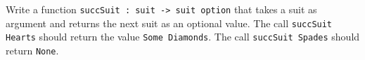 Write a function \lstinline{succSuit : suit -> suit option} that takes
a suit as argument and returns the next suit as an optional value.  The
call \lstinline{succSuit Hearts} should return the value
\lstinline{Some Diamonds}. The call \lstinline{succSuit Spades} should
return \lstinline{None}.
